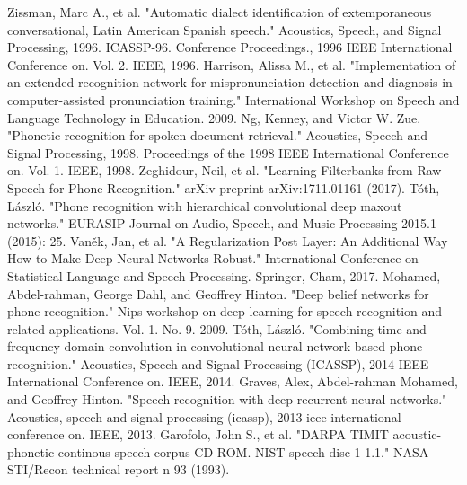 \documentclass[conference]{IEEEtran}
\begin{document}
\begin{thebibliography}{1}

Zissman, Marc A., et al. "Automatic dialect identification of extemporaneous conversational, Latin American Spanish speech." Acoustics, Speech, and Signal Processing, 1996. ICASSP-96. Conference Proceedings., 1996 IEEE International Conference on. Vol. 2. IEEE, 1996.
Harrison, Alissa M., et al. "Implementation of an extended recognition network for mispronunciation detection and diagnosis in computer-assisted pronunciation training." International Workshop on Speech and Language Technology in Education. 2009.
Ng, Kenney, and Victor W. Zue. "Phonetic recognition for spoken document retrieval." Acoustics, Speech and Signal Processing, 1998. Proceedings of the 1998 IEEE International Conference on. Vol. 1. IEEE, 1998.
Zeghidour, Neil, et al. "Learning Filterbanks from Raw Speech for Phone Recognition." arXiv preprint arXiv:1711.01161 (2017).
Tóth, László. "Phone recognition with hierarchical convolutional deep maxout networks." EURASIP Journal on Audio, Speech, and Music Processing 2015.1 (2015): 25.
Vaněk, Jan, et al. "A Regularization Post Layer: An Additional Way How to Make Deep Neural Networks Robust." International Conference on Statistical Language and Speech Processing. Springer, Cham, 2017.
Mohamed, Abdel-rahman, George Dahl, and Geoffrey Hinton. "Deep belief networks for phone recognition." Nips workshop on deep learning for speech recognition and related applications. Vol. 1. No. 9. 2009.
Tóth, László. "Combining time-and frequency-domain convolution in convolutional neural network-based phone recognition." Acoustics, Speech and Signal Processing (ICASSP), 2014 IEEE International Conference on. IEEE, 2014.
Graves, Alex, Abdel-rahman Mohamed, and Geoffrey Hinton. "Speech recognition with deep recurrent neural networks." Acoustics, speech and signal processing (icassp), 2013 ieee international conference on. IEEE, 2013.
Garofolo, John S., et al. "DARPA TIMIT acoustic-phonetic continous speech corpus CD-ROM. NIST speech disc 1-1.1." NASA STI/Recon technical report n 93 (1993).
\end{thebibliography}


% 
\end{document}
